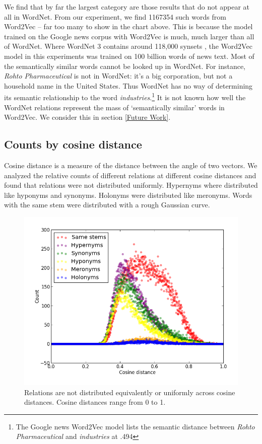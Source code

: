 \documentclass[titlepage]{article}
\begin{document}
We find that by far the largest category are those results that do not appear at all in WordNet. From our experiment, we find 1167354 such words from Word2Vec -- far too many to show in the chart above. This is because the model trained on the Google news corpus with Word2Vec is much, much larger than all of WordNet. Where WordNet 3 contains around 118,000 synsets \cite{wordnet}, the Word2Vec model in this experiments was trained on 100 billion words \cite{Word2VecWebsite} of news text. Most of the semantically similar words cannot be looked up in WordNet. For instance, \textit{Rohto Pharmaceutical} is not in WordNet: it's a big corporation, but not a household name in the United States. Thus WordNet has no way of determining its semantic relationship to the word \textit{industries}.\footnote{The Google news Word2Vec model lists the semantic distance between \textit{Rohto Pharmaceutical} and \textit{industries} at .494} It is not known how well the WordNet relations represent the mass of `semantically similar' words in Word2Vec. We consider this in section \ref{Future Work}.

\subsection{Counts by cosine distance} \label{cosine}

Cosine distance is a measure of the distance between the angle of two vectors. We analyzed the relative counts of different relations at different cosine distances and found that relations were not distributed uniformly. Hypernyms where distributed like hyponyms and synonyms. Holonyms were distributed like meronyms. Words with the same stem were distributed with a rough Gaussian curve.  

\begin{figure}[!htbp]
\centering
  \includegraphics[scale=.5]{increment_lines.png}
  \captionsetup{justification=centering, margin=4cm }
  \caption{Relations are not distributed equivalently or uniformly across cosine distances. Cosine distances range from 0 to 1.}
  \label{fig:increment_lines.png}
\end{figure}
\end{document}
